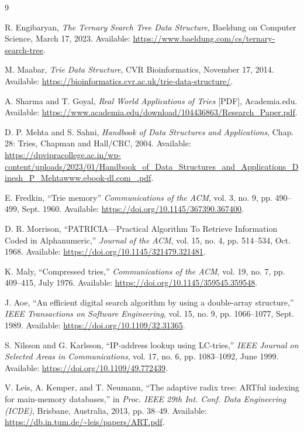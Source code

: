 
\renewcommand{\refname}{Referències} %

\begin{thebibliography}{9}

R. Engibaryan, \textit{The Ternary Search Tree Data Structure}, Baeldung on Computer Science, March 17, 2023. Available: \url{https://www.baeldung.com/cs/ternary-search-tree}.

M. Maabar, \textit{Trie Data Structure}, CVR Bioinformatics, November 17, 2014. Available: \url{https://bioinformatics.cvr.ac.uk/trie-data-structure/}.

A. Sharma and T. Goyal, \textit{Real World Applications of Tries} [PDF], Academia.edu. Available: \url{https://www.academia.edu/download/104436863/Research_Paper.pdf}.

D. P. Mehta and S. Sahni, \textit{Handbook of Data Structures and Applications}, Chap. 28: Tries, Chapman and Hall/CRC, 2004. Available: \url{https://dpvipracollege.ac.in/wp-content/uploads/2023/01/Handbook_of_Data_Structures_and_Applications_Dinesh_P_Mehtawww.ebook-dl.com_.pdf}.

E. Fredkin, ``Trie memory'' \textit{Communications of the ACM}, vol. 3, no. 9, pp. 490--499, Sept. 1960. Available: \url{https://doi.org/10.1145/367390.367400}.

D. R. Morrison, ``PATRICIA—Practical Algorithm To Retrieve Information Coded in Alphanumeric,'' \textit{Journal of the ACM}, vol. 15, no. 4, pp. 514--534, Oct. 1968. Available: \url{https://doi.org/10.1145/321479.321481}.

K. Maly, ``Compressed tries,'' \textit{Communications of the ACM}, vol. 19, no. 7, pp. 409--415, July 1976. Available: \url{https://doi.org/10.1145/359545.359548}.

J. Aoe, ``An efficient digital search algorithm by using a double-array structure,'' \textit{IEEE Transactions on Software Engineering}, vol. 15, no. 9, pp. 1066--1077, Sept. 1989. Available: \url{https://doi.org/10.1109/32.31365}.

S. Nilsson and G. Karlsson, ``IP-address lookup using LC-tries,'' \textit{IEEE Journal on Selected Areas in Communications}, vol. 17, no. 6, pp. 1083--1092, June 1999. Available: \url{https://doi.org/10.1109/49.772439}.

V. Leis, A. Kemper, and T. Neumann, ``The adaptive radix tree: ARTful indexing for main-memory databases,'' in \textit{Proc. IEEE 29th Int. Conf. Data Engineering (ICDE)}, Brisbane, Australia, 2013, pp. 38--49. Available: \url{https://db.in.tum.de/~leis/papers/ART.pdf}.


\end{thebibliography}
